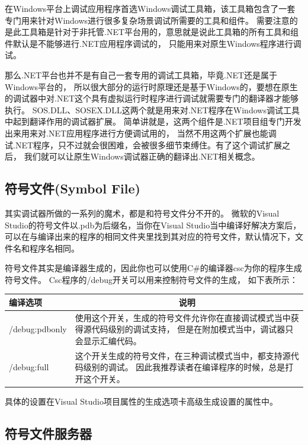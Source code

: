 \documentclass{book}
\begin{document}
在Windows平台上调试应用程序首选Windows调试工具箱，该工具箱包含了一套专门用来针对Windows进行很多复杂场景调试所需要的工具和组件。
需要注意的是此工具箱是针对于非托管.NET平台用的，意思就是说此工具箱的所有工具和组件默认是不能够进行.NET应用程序调试的，
只能用来对原生Windows程序进行调试。

那么.NET平台也并不是有自己一套专用的调试工具箱，毕竟.NET还是属于Windows平台的，
所以很大部分的运行时原理还是基于Windows的，要想在原生的调试器中对.NET这个具有虚拟运行时程序进行调试就需要专门的翻译器才能够执行。
SOS.DLL、SOSEX.DLL这两个就是用来对.NET程序在Windows调试工具中起到翻译作用的调试器扩展。
简单讲就是，这两个组件是.NET项目组专门开发出来用来对.NET应用程序进行方便调试用的，
当然不用这两个扩展也能调试.NET程序，只不过就会很困难，会被很多细节束缚住。有了这个调试扩展之后，
我们就可以让原生Windows调试器正确的翻译出.NET相关概念。

\subsection{符号文件(Symbol File)}

其实调试器所做的一系列的魔术，都是和符号文件分不开的。
微软的Visual Studio的符号文件以.pdb为后缀名，当你在Visual Studio当中编译好解决方案后，
可以在与编译出来的程序的相同文件夹里找到其对应的符号文件，默认情况下，文件名和程序名相同。

符号文件其实是编译器生成的，因此你也可以使用C\#的编译器csc为你的程序生成符号文件。
Csc程序的/debug开关可以用来控制符号文件的生成，
如下表所示：

\begin{tabular}{lp{10cm}}
	\hline
	\multirow{1}{*}{\textbf{编译选项}}			
	& \multicolumn{1}{c}{\textbf{说明}}\\
	\hline
	/debug:pdbonly & 使用这个开关，生成的符号文件允许你在直接调试模式当中获得源代码级别的调试支持，
	但是在附加模式当中，调试器只会显示汇编代码。\\
	/debug:full & 这个开关生成的符号文件，在三种调试模式当中，都支持源代码级别的调试。
	因此我推荐读者在编译程序的时候，总是打开这个开关。\\		
	\hline					
\end{tabular}

具体的设置在Visual Studio项目属性的生成选项卡高级生成设置的属性中。

\subsection{符号文件服务器}
\end{document}
